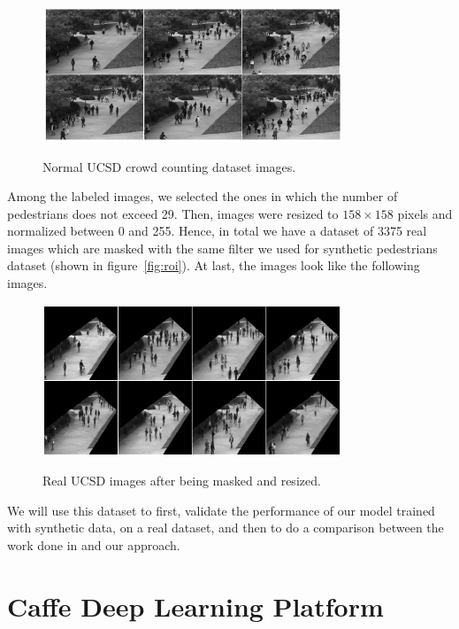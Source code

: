 \begin{figure}[H]
	\centering
	{\includegraphics[width=0.8\textwidth]{images/normalucsd}}
	\caption{Normal UCSD crowd counting dataset images.}
	\label{fig:ucsdorg}
\end{figure}

\indent Among the labeled images, we selected the ones in which the number of pedestrians does not exceed 29. Then, images were resized to  $158\times158$ pixels and normalized between 0 and 255. Hence, in total we have a dataset of 3375 real images which are masked with the same filter we used for synthetic pedestrians dataset (shown in figure~\ref{fig:roi}). At last, the images look like the following images.

\begin{figure}[H]
	\centering
	{\includegraphics[width=0.8\textwidth]{images/testucsd}}
	\caption{Real UCSD images after being masked and resized.}
	\label{fig:testucsd}
\end{figure}


\indent We will use this dataset to first, validate the performance of our model trained with synthetic data, on a real dataset, and then to do a comparison between the work done in \cite{chan2008privacy} and our approach.



\section{Caffe Deep Learning Platform}

